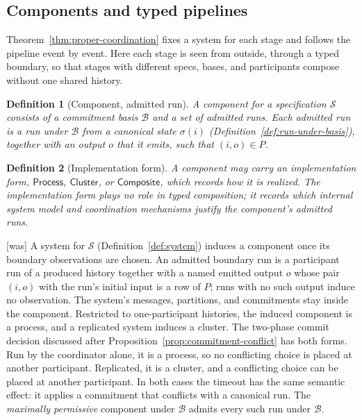 \documentclass[sigconf]{cidr-2027}
\newtheorem{definition}{Definition}
\theoremstyle{remark}
\newcommand{\commitment}{commitment\xspace}
\newcommand{\commitments}{commitments\xspace}
\newcommand{\Spec}{\mathcal{S}}
\begin{document}
\subsection{Components and typed pipelines}
\label{app:components}

Theorem~\ref{thm:proper-coordination} fixes a system for each stage and
follows the pipeline event by event.  Here each stage is seen from outside,
through a typed boundary, so that stages with different specs,
bases, and participants compose without one shared history.

\begin{definition}[Component, admitted run]
\label{def:component}
A \emph{component} for a specification $\Spec$ consists of a \commitment basis
$\mathcal B$ and a set of \emph{admitted runs}.  Each admitted run is a run
under $\mathcal B$ from a canonical state $\sigma(i)$
(Definition~\ref{def:run-under-basis}), together with an output $o$ that it
emits, such that $(i,o)\in P$.
\end{definition}

\begin{definition}[Implementation form]
\label{def:implementation-form}
A component may carry an \emph{implementation form}, $\mathsf{Process}$,
$\mathsf{Cluster}$, or $\mathsf{Composite}$, which records how it is
realized.  The implementation form plays no role in typed composition; it
records which internal system model and coordination mechanisms justify the
component's admitted runs.
\end{definition}



{\footnotesize\color{black!50}\noindent\textsf{[was]} A system for $\Spec$ (Definition~\ref{def:system}) induces a component once
its boundary observations are chosen.  An admitted boundary run is a
participant run of a produced history together with a named emitted output
$o$ whose pair $(i,o)$ with the run's initial input is a row of $P$; runs
with no such output induce no observation.  The system's messages,
partitions, and \commitments stay inside the component.  Restricted to
one-participant histories, the induced component is a process, and a
replicated system induces a cluster.  The two-phase commit decision discussed
after Proposition~\ref{prop:commitment-conflict} has both forms.  Run by the coordinator alone, it is a process, so no conflicting
choice is placed at another participant.  Replicated, it is a cluster, and a
conflicting choice can be placed at another participant.  In both cases the
timeout has the same semantic effect: it applies a \commitment that conflicts
with a canonical run.  The \emph{maximally permissive} component under $\mathcal B$
admits every such run under $\mathcal B$.\par}
\end{document}
